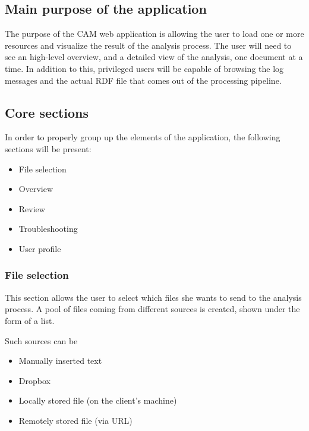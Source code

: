 \documentclass[12pt,svgnames]{memoir}
\begin{document}
\subsection{Main purpose of the
application}\label{main-purpose-of-the-application}

The purpose of the CAM web application is allowing the user to load one
or more resources and visualize the result of the analysis process. The
user will need to see an high-level overview, and a detailed view of the
analysis, one document at a time. In addition to this, privileged users
will be capable of browsing the log messages and the actual RDF file
that comes out of the processing pipeline.

\subsection{Core sections}\label{core-sections}

In order to properly group up the elements of the application, the
following sections will be present:

\begin{itemize}
\itemsep1pt\parskip0pt
\item
  File selection
\item
  Overview
\item
  Review
\item
  Troubleshooting
\item
  User profile
\end{itemize}

\subsubsection*{File selection}\label{file-selection}

This section allows the user to select which files she wants to send to
the analysis process. A pool of files coming from different sources is
created, shown under the form of a list.

Such sources can be

\begin{itemize}
\itemsep1pt\parskip0pt
\item
  Manually inserted text
\item
  Dropbox
\item
  Locally stored file (on the client's machine)
\item
  Remotely stored file (via URL)
\end{itemize}
\end{document}
